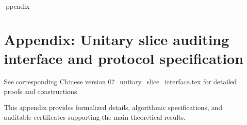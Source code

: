 ppendix

\section*{Appendix: Unitary slice auditing interface and protocol specification}

See corresponding Chinese version 07_unitary_slice_interface.tex for detailed proofs and constructions.

This appendix provides formalized details, algorithmic specifications, and auditable certificates supporting the main theoretical results.
